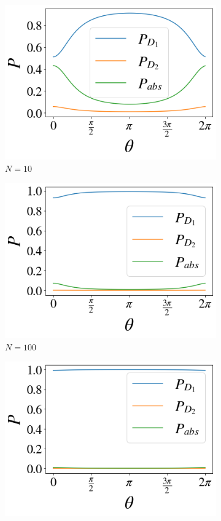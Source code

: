 \documentclass[12pt]{book}
\begin{document}
\begin{figure}[!t]
\begin{subfigure}[b]{0.30\linewidth}
\includegraphics[width=\linewidth]{images/Azuma_phases10.png}
\caption{$N=10$ }
\label{fig:BS1}
\end{subfigure}
\begin{subfigure}[b]{0.30\linewidth}
\includegraphics[width=\linewidth]{images/Azuma_phases100.png}
\caption{$N=100$}
\label{100}
\end{subfigure}
\begin{subfigure}[b]{0.30\linewidth}
\includegraphics[width=\linewidth]{images/Azuma_phases1000.png}

\end{subfigure}
\end{figure}
\end{document}
